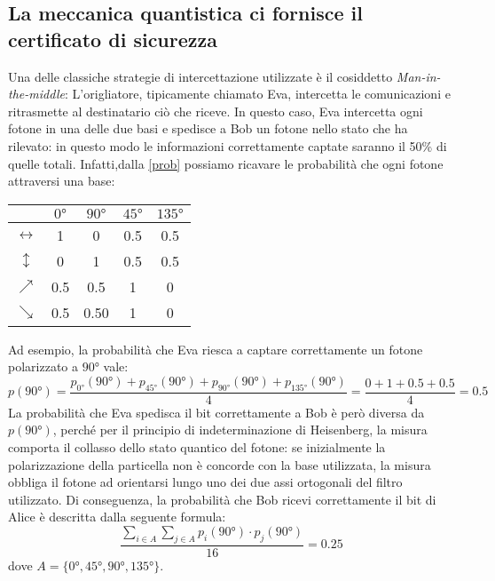 \documentclass[italian,A4,12pt]{article}
\begin{document}
    \subsection{La meccanica quantistica ci fornisce il certificato di sicurezza}
    Una delle classiche strategie di intercettazione utilizzate è il cosiddetto \textit{Man-in-the-middle}: L'origliatore, tipicamente chiamato Eva, intercetta le comunicazioni e ritrasmette al destinatario ciò che riceve.
    In questo caso, Eva intercetta ogni fotone in una delle due basi e spedisce a Bob un fotone nello stato che ha rilevato:
    in questo modo le informazioni correttamente captate saranno il 50\% di quelle totali.
    Infatti,dalla \eqref{prob} possiamo ricavare le probabilità che ogni fotone attraversi una base:
    \begin{center}
      \begin{tabular}{|c|c|c|c|c|}
        \hline
        &$\ang{0}$&$\ang{90}$&$\ang{45}$&$\ang{135}$\\
        \hline
        $\leftrightarrow$&1&0&0.5&0.5\\
        \hline
        $\updownarrow$&0&1&0.5&0.5\\
        \hline
        $\nearrow$&0.5&0.5&1&0\\
        \hline
        $\searrow$&0.5&0.50&1&0\\
        \hline
      \end{tabular}
    \end{center}
    Ad esempio, la probabilità che Eva riesca a captare correttamente un fotone polarizzato a $\ang{90}$ vale:
    $$p(\ang{90})=\frac{p_{\ang{0}}(\ang{90})+p_{\ang{45}}(\ang{90})+p_{\ang{90}}(\ang{90})+p_{\ang{135}}(\ang{90})}{4}=\frac{0+1+0.5+0.5}{4}=0.5$$
    La probabilità che Eva spedisca il bit correttamente a Bob è però diversa da $p(\ang{90})$, perché per il principio di indeterminazione di Heisenberg, la misura comporta il collasso dello stato quantico del fotone: se inizialmente la polarizzazione della particella non è concorde con la base utilizzata, la misura obbliga il fotone ad orientarsi lungo uno dei due assi ortogonali del filtro utilizzato.
    Di conseguenza, la probabilità che Bob ricevi correttamente il bit di Alice è descritta dalla seguente formula:
    \begin{equation*}
      \frac{\displaystyle\sum_{i\in A}\displaystyle\sum_{j\in A} p_i(\ang{90})\cdot p_j(\ang{90})}{16}=0.25
    \end{equation*}
    dove $A=\{\ang{0},\ang{45},\ang{90},\ang{135}\}$.\\
\end{document}
